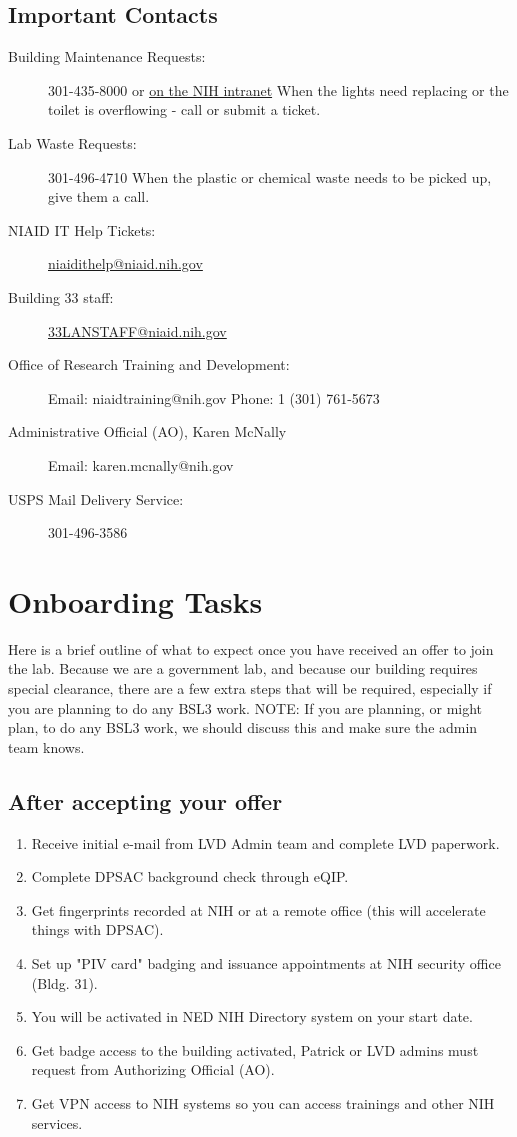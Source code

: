 \documentclass[10pt, letterpaper, twocolumn]{article} %
\begin{document}
\subsection{Important Contacts}
\begin{description}
\item [Building Maintenance Requests:] 301-435-8000 or \href{https://www.orf.od.nih.gov/PropertyManagement/MaintenanceServiceRequests/Pages/default.aspx}{on the NIH intranet}
When the lights need replacing or the toilet is overflowing - call or submit a ticket. 
\item [Lab Waste Requests:] 301-496-4710
When the plastic or chemical waste needs to be picked up, give them a call. 
\item [NIAID IT Help Tickets:]
\href{mailto:niaidithelp@niaid.nih.gov}{niaidithelp@niaid.nih.gov}
\item [Building 33 staff:] \href{mailto:33LANSTAFF@niaid.nih.gov}{33LANSTAFF@niaid.nih.gov}
\item [Office of Research Training and Development:]
Email: niaidtraining@nih.gov\newline
Phone: 1 (301) 761-5673
\item [Administrative Official (AO), Karen McNally]
Email: karen.mcnally@nih.gov
\item [USPS Mail Delivery Service:] 301-496-3586
\end{description}

\section{Onboarding Tasks}
Here is a brief outline of what to expect once you have received an offer to join the lab. Because we are a government lab, and because our building requires special clearance, there are a few extra steps that will be required, especially if you are planning to do any BSL3 work.
NOTE: If you are planning, or might plan, to do any BSL3 work, we should discuss this and make sure the admin team knows.

\subsection{After accepting your offer}
\begin{enumerate}
\item Receive initial e-mail from LVD Admin team and complete LVD paperwork.
\item Complete DPSAC background check through eQIP.
\item Get fingerprints recorded at NIH or at a remote office (this will accelerate things with DPSAC).
\item Set up "PIV card" badging and issuance appointments at NIH security office (Bldg. 31).
\item You will be activated in NED NIH Directory system on your start date.
\item Get badge access to the building activated, Patrick or LVD admins must request from Authorizing Official (AO).
\item Get VPN access to NIH systems so you can access trainings and other NIH services.
\end{enumerate}
\end{document}
